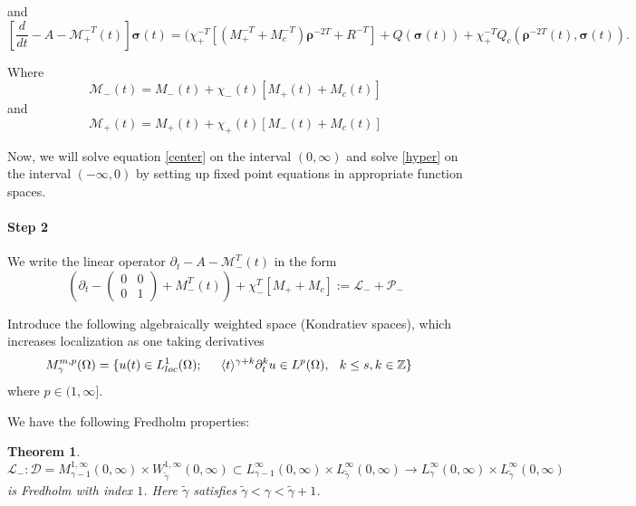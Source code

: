 \documentclass[letterpaper,11pt]{article}
\newcommand{\eps}{\varepsilon}
\newcommand{\Rho}{\bm{\rho}}
\numberwithin{equation}{section}
\theoremstyle{plain}
\newtheorem{theorem}{Theorem}[section]
\begin{document}
and 
\begin{equation}\label{hyper}
\left[\frac{d}{dt}-A-\mathcal{M}_+^{-T}(t)\right]\bm{\sigma}(t)  = (\chi_+^{-T}[(M_+^{-T}+M_c^{-T})\Rho^{-2T}+R^{-T}]+ Q(\bm{\sigma}(t))+\chi_+^{-T}Q_c(\bm{\rho}^{-2T}(t),\bm{\sigma}(t)).
\end{equation}

Where
\[
\mathcal{M}_-(t) = M_-(t)  +\chi_-(t)[M_+(t)+M_c(t)]
\]
and 
\[
\mathcal{M}_+(t) =  M_+(t) +\chi_+(t)[M_-(t)+M_c(t)]
\]

Now, we will solve equation \eqref{center} on the interval $(0,\infty)$ and solve \eqref{hyper} on the interval $(-\infty,0)$ by setting up fixed point equations in appropriate function spaces.

\paragraph{Step 2}
We write the linear operator $\partial_t -A-\mathcal{M}_-^T(t)$ in the form
\[
\left(\partial_t - \begin{pmatrix}
0 & 0\\
0 &1
\end{pmatrix} +M_-^T(t)\right)+\chi_-^T[M_++M_c] := \mathcal{L}_- + \mathcal{P}_-
\]

Introduce the following algebraically weighted space (Kondratiev spaces), which increases localization as one taking derivatives
\begin{align*}
M^{m,p}_{\gamma}(\Omega)=\{ &u(t) \in L^1_{loc}(\Omega); \hspace{0.2in} \langle t \rangle^{\gamma+ k} \partial^k_t u \in L^p(\Omega), \hspace{0.1in} k \le s, k \in \mathbb{Z}
\}
\end{align*}
where $p\in (1,\infty]$.


We have the following Fredholm properties:

\begin{theorem}
$\mathcal{L_-}: \mathcal{D} = M_{\gamma-1}^{1,\infty}(0,\infty) \times W_{\tilde{\gamma}}^{1,\infty}(0,\infty) \subset L_{\gamma-1}^{\infty}(0,\infty)\times L_{\tilde{\gamma}}^{\infty}(0,\infty) \to L_{\gamma}^{\infty}(0,\infty)\times L_{\tilde{\gamma}}^\infty(0,\infty)$ is Fredholm with index $1$. Here $\tilde{\gamma}$ satisfies $\tilde{\gamma} < \gamma < \tilde{\gamma}+1$.
\end{theorem}
\end{document}
